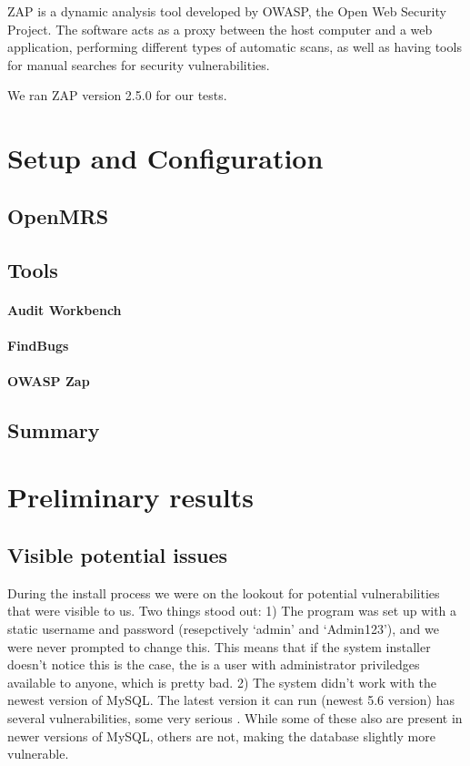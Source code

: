 \documentclass{report} %
\begin{document}
ZAP is a dynamic analysis tool developed by OWASP, the Open Web Security
Project. The software acts as a proxy between the host computer and a web
application, performing different types of automatic scans, as well as having
tools for manual searches for security vulnerabilities\autocite[]{ZAP}.


We ran ZAP version 2.5.0 for our tests.

\section{Setup and Configuration}
\subsection{OpenMRS}
\subsection{Tools}
\paragraph{Audit Workbench}
\paragraph{FindBugs}
\paragraph{OWASP Zap}
\subsection{Summary}

\section{Preliminary results}

\subsection{Visible potential issues}
  During the install process we were on the lookout for potential vulnerabilities that
  were visible to us. Two things stood out:
  1) The program was set up with a static username and password (resepctively `admin'
  and `Admin123'), and we were never prompted to change this. This means that if the system
  installer doesn't notice this is the case, the is a user with administrator priviledges
  available to anyone, which is pretty bad.
  2) The system didn't work with the newest version of MySQL. The latest version it can run (newest 5.6 version)
  has several vulnerabilities, some very serious \autocite[]{CVEDetails}. While some of these
  also are present in newer versions of MySQL, others are not, making the database slightly more vulnerable.
\end{document}

